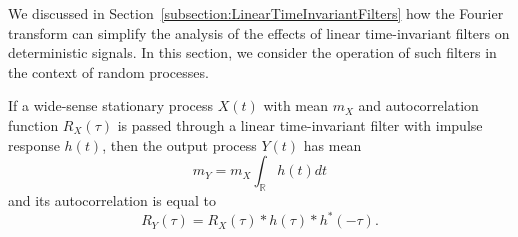 We discussed in Section~\ref{subsection:LinearTimeInvariantFilters} how the Fourier transform can simplify the analysis of the effects of linear time-invariant filters on deterministic signals.
In this section, we consider the operation of such filters in the context of random processes.

\begin{theorem}
If a wide-sense stationary process $X(t)$ with mean $m_X$ and autocorrelation function $R_X(\tau)$ is passed through a linear time-invariant filter with impulse response $h(t)$, then the output process $Y(t)$ has mean
\begin{equation*}
m_Y = m_X \int_{\mathbb{R}} h(t) dt
\end{equation*}
and its autocorrelation is equal to
\begin{equation*}
R_Y (\tau) = R_X(\tau) \ast h(\tau) \ast h^*(-\tau) .
\end{equation*}
\end{theorem}
